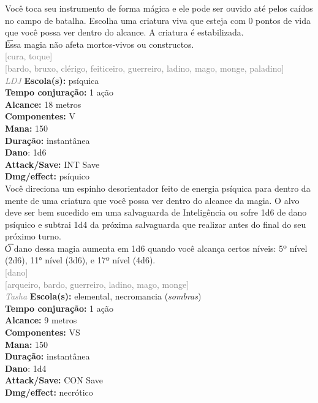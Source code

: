 \documentclass{RPG_Adventure}[2021/10/20]
\begin{document}
{\normalsize Você toca seu instrumento de forma mágica e ele pode ser ouvido até pelos caídos no campo de batalha. Escolha uma criatura viva que esteja com 0 pontos de vida que você possa ver dentro do alcance. A criatura é estabilizada.\\\t Essa magia não afeta mortos-vivos ou constructos.\\}
{\scriptsize \textcolor{gray}{[cura, toque]\\}}
{\scriptsize \textcolor{gray}{[bardo, bruxo, clérigo, feiticeiro, guerreiro, ladino, mago, monge, paladino]\\}}
{\tiny \textcolor{gray}{\textit{LDJ}}}\jump{}
{\small \t \textbf{Escola(s):} psíquica\\\t \textbf{Tempo conjuração:} 1 ação\\\t \textbf{Alcance:} 18 metros\\\t \textbf{Componentes:} V\\\t \textbf{Mana:} 150\\\t \textbf{Duração:} instantânea\\\t \textbf{Dano}: 1d6\\\t \textbf{Attack/Save:} INT Save\\\t \textbf{Dmg/effect:} psíquico\\}
{\normalsize Você direciona um espinho desorientador feito de energia psíquica para dentro da mente de uma criatura que você possa ver dentro do alcance da magia. O alvo deve ser bem sucedido em uma salvaguarda de Inteligência ou sofre 1d6 de dano psíquico e subtrai 1d4 da próxima salvaguarda que realizar antes do final do seu próximo turno.\\\t O dano dessa magia aumenta em 1d6 quando você alcança certos níveis: 5º nível (2d6), 11° nível (3d6), e 17º nível (4d6).\\}
{\scriptsize \textcolor{gray}{[dano]\\}}
{\scriptsize \textcolor{gray}{[arqueiro, bardo, guerreiro, ladino, mago, monge]\\}}
{\tiny \textcolor{gray}{\textit{Tasha}}}\jump{}
{\small \t \textbf{Escola(s):} elemental, necromancia (\textit{sombras})\\\t \textbf{Tempo conjuração:} 1 ação\\\t \textbf{Alcance:} 9 metros\\\t \textbf{Componentes:} VS\\\t \textbf{Mana:} 150\\\t \textbf{Duração:} instantânea\\\t \textbf{Dano}: 1d4\\\t \textbf{Attack/Save:} CON Save\\\t \textbf{Dmg/effect:} necrótico\\}
\end{document}
